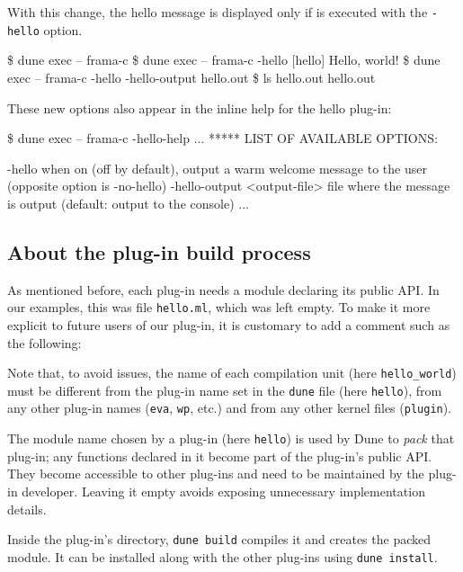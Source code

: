 With this change, the hello message is displayed only if \framac is
executed with the \texttt{-hello} option.
\begin{frama-c-commands}
\$ dune exec -- frama-c
\$ dune exec -- frama-c -hello
[hello] Hello, world!
\$ dune exec -- frama-c -hello -hello-output hello.out
\$ ls hello.out
hello.out
\end{frama-c-commands}

These new options also appear in the inline help for the hello plug-in:
\begin{frama-c-commands}
\$ dune exec -- frama-c -hello-help
...
***** LIST OF AVAILABLE OPTIONS:

-hello              when on (off by default), output a warm welcome message
                    to the user (opposite option is -no-hello)
-hello-output <output-file>  file where the message is output (default:
                    output to the console)
...
\end{frama-c-commands}

\subsection{About the plug-in build process}

As mentioned before, each plug-in needs a module declaring its public API.
In our examples, this was file \verb|hello.ml|, which was left empty.
To make it more explicit to future users of our plug-in, it is customary to
add a comment such as the following:


Note that, to avoid issues, the name of each compilation unit
(here \texttt{hello\_world}) must be different from the plug-in name set in
the \texttt{dune} file (here \texttt{hello}), from any other plug-in names
(\eg \texttt{eva}, \texttt{wp}, etc.) and from any other \framac kernel
\caml files (\eg \texttt{plugin}).

The module name chosen by a plug-in (here \texttt{hello}) is used by Dune to
{\em pack} that plug-in; any functions declared in it become part of the
plug-in's public API. They become accessible to other plug-ins and need to be
maintained by the plug-in developer. Leaving it empty avoids exposing
unnecessary implementation details.

Inside the plug-in's directory, \texttt{dune build} compiles it and creates the
packed module. It can be installed along with the other \framac plug-ins using
\verb|dune install|.

